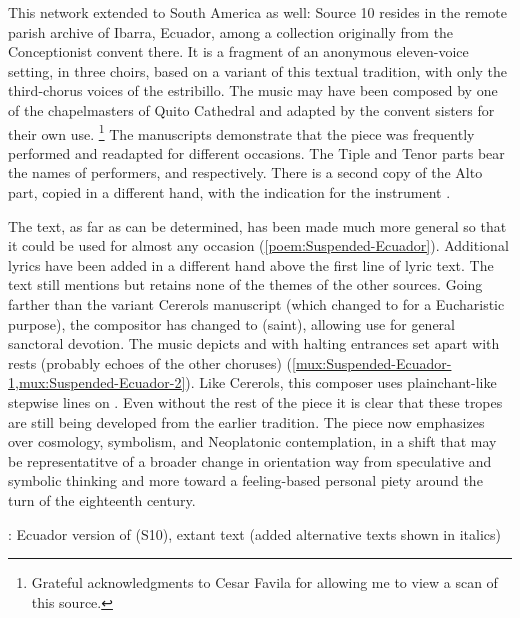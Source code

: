 This network extended to South America as well: Source 10 resides in the remote
parish archive of Ibarra, Ecuador, among a collection originally from the
Conceptionist convent there.
It is a fragment of an anonymous eleven-voice setting, in three choirs, based on
a variant of this textual tradition, with only the third-chorus voices of the
estribillo.
The music may have been composed by one of the chapelmasters of Quito Cathedral
and adapted by the convent sisters for their own use.%
    \footnote{Grateful acknowledgments to Cesar Favila for allowing me to view a
    scan of this source.}
The manuscripts demonstrate that the piece was frequently performed and
readapted for different occasions.
The Tiple and Tenor parts bear the names of performers, 
and  respectively.
There is a second copy of the Alto part, copied in a different hand, with the
indication for the instrument . %

The text, as far as can be determined, has been made much more general so that
it could be used for almost any occasion (\cref{poem:Suspended-Ecuador}).
Additional lyrics have been added in a different hand above the first line of
lyric text. %
The text still mentions  but retains none of the themes of the
other sources.
Going farther than the variant Cererols manuscript (which changed 
to  for a Eucharistic purpose), the compositor has changed
 to  (saint), allowing use for general sanctoral
devotion.
The music depicts  and  with halting
entrances set apart with rests (probably echoes of the other choruses)
(\cref{mux:Suspended-Ecuador-1,mux:Suspended-Ecuador-2}).
Like Cererols, this composer uses plainchant-like stepwise lines on .
Even without the rest of the piece it is clear that these tropes are still being
developed from the earlier tradition.
The piece now emphasizes  over cosmology, symbolism,
and Neoplatonic contemplation, in a shift that may be representatitve of a
broader change in orientation way from speculative and symbolic thinking and
more toward a feeling-based personal piety around the turn of the eighteenth
century.

{: Ecuador version of 
(S10), extant text (added alternative texts shown in italics)}

